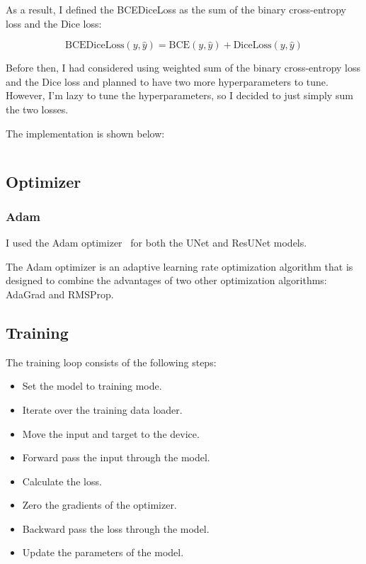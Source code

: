 As a result, I defined the BCEDiceLoss as the sum of the binary cross-entropy loss and the Dice loss:

\begin{equation}
    \text{BCEDiceLoss}(y, \hat{y}) = \text{BCE}(y, \hat{y}) + \text{DiceLoss}(y, \hat{y})
\end{equation}

Before then, I had considered using weighted sum of the binary cross-entropy loss and the Dice loss and planned to have two more hyperparameters to tune.
However, I'm lazy to tune the hyperparameters, so I decided to just simply sum the two losses.

The implementation is shown below:

\inputminted[firstline=44, highlightlines={50}]{python}{../src/utils.py}

\subsection{Optimizer}

\subsubsection{Adam}

I used the Adam optimizer~\cite{Adam} for both the UNet and ResUNet models.

The Adam optimizer is an adaptive learning rate optimization algorithm that is designed to combine the advantages of two other optimization algorithms: AdaGrad and RMSProp.

\subsection{Training}

The training loop consists of the following steps:
\begin{itemize}
    \item Set the model to training mode.
    \item Iterate over the training data loader.
    \item Move the input and target to the device.
    \item Forward pass the input through the model.
    \item Calculate the loss.
    \item Zero the gradients of the optimizer.
    \item Backward pass the loss through the model.
    \item Update the parameters of the model.
\end{itemize}

